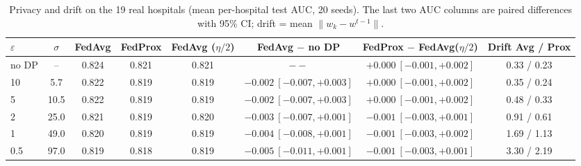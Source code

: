 \begin{table}[t]
\caption{Privacy and drift on the 19 real hospitals (mean per-hospital test AUC, 20 seeds). The last two AUC columns are paired differences with 95\% CI; drift = mean $\|w_k-w^{t-1}\|$.}
\centering\small
\begin{tabular}{lccccccc}
\toprule
$\varepsilon$ & $\sigma$ & FedAvg & FedProx & FedAvg ($\eta/2$) & FedAvg $-$ no DP & FedProx $-$ FedAvg($\eta/2$) & Drift Avg / Prox \\
\midrule
no DP & -- & 0.824 & 0.821 & 0.821 & $--$ & $+0.000\ [\ensuremath{-}0.001, +0.002]$ & 0.33 / 0.23 \\
10 & 5.7 & 0.822 & 0.819 & 0.819 & $-0.002\ [\ensuremath{-}0.007, +0.003]$ & $+0.000\ [\ensuremath{-}0.001, +0.002]$ & 0.35 / 0.24 \\
5 & 10.5 & 0.822 & 0.819 & 0.819 & $-0.002\ [\ensuremath{-}0.007, +0.003]$ & $+0.000\ [\ensuremath{-}0.001, +0.002]$ & 0.48 / 0.33 \\
2 & 25.0 & 0.821 & 0.819 & 0.820 & $-0.003\ [\ensuremath{-}0.007, +0.001]$ & $-0.001\ [\ensuremath{-}0.003, +0.001]$ & 0.91 / 0.61 \\
1 & 49.0 & 0.820 & 0.819 & 0.819 & $-0.004\ [\ensuremath{-}0.008, +0.001]$ & $-0.001\ [\ensuremath{-}0.003, +0.002]$ & 1.69 / 1.13 \\
0.5 & 97.0 & 0.819 & 0.818 & 0.819 & $-0.005\ [\ensuremath{-}0.011, +0.001]$ & $-0.001\ [\ensuremath{-}0.003, +0.001]$ & 3.30 / 2.19 \\
\bottomrule
\end{tabular}
\label{tab:pca19_privacy}
\end{table}
